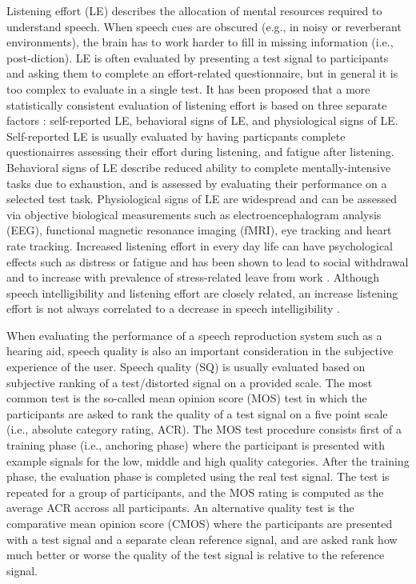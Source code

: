 Listening effort (LE) describes the allocation of mental resources required to understand speech. When speech cues are obscured (e.g., in noisy or reverberant environments), the brain has to work harder to fill in missing information (i.e., post-diction). LE is often evaluated by presenting a test signal to participants and asking them to complete an effort-related questionnaire, but in general it is too complex to evaluate in a single test. It has been proposed that a more statistically consistent evaluation of listening effort is based on three separate factors \citep{shields2023exploring}: self-reported LE, behavioral signs of LE, and physiological signs of LE. Self-reported LE is usually evaluated by having particpants complete questionairres assessing their effort during listening, and fatigue after listening. Behavioral signs of LE describe reduced ability to complete mentally-intensive tasks due to exhaustion, and is assessed by evaluating their performance on a selected test task. Physiological signs of LE are widespread and can be assessed via objective biological measurements such as electroencephalogram analysis (EEG), functional magnetic resonance imaging (fMRI), eye tracking and heart rate tracking. Increased listening effort in every day life can have psychological effects such as distress or fatigue and has been shown to lead to social withdrawal and to increase with prevalence of stress-related leave from work \citep{ohlenforst2017effects}. Although speech intelligibility and listening effort are closely related, an increase listening effort is not always correlated to a decrease in speech intelligibility \citep{winn2021listening}.

When evaluating the performance of a speech reproduction system such as a hearing aid, speech quality is also an important consideration in the subjective experience of the user. Speech quality (SQ) is usually evaluated based on subjective ranking of a test/distorted signal on a provided scale.  The most common test is the so-called mean opinion score (MOS) test in which the participants are asked to rank the quality of a test signal on a five point scale (i.e., absolute category rating, ACR). The MOS test procedure consists first of a training phase (i.e., anchoring phase) where the participant is presented with example signals for the low, middle and high quality categories. After the training phase, the evaluation phase is completed using the real test signal. The test is repeated for a group of participants, and the MOS rating is computed as the average ACR accross all participants. An alternative quality test is the comparative mean opinion score (CMOS) where the participants are presented with a test signal and a separate clean reference signal, and are asked rank how much better or worse the quality of the test signal is relative to the reference signal.

